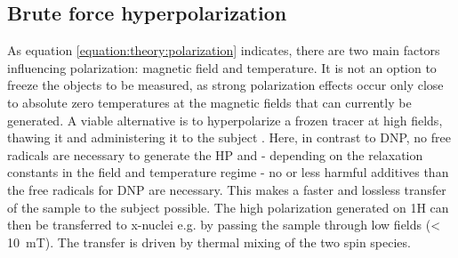         \subsection{Brute force hyperpolarization}
        As equation \ref{equation:theory:polarization} indicates, there are two main factors influencing polarization: magnetic field and temperature. It is not an option to freeze the objects to be measured, as strong polarization effects occur only close to absolute zero temperatures at the magnetic fields that can currently be generated. A viable alternative is to hyperpolarize a frozen tracer at high fields, thawing it and administering it to the subject \cite{hirsch_brute-force_2015}. Here, in contrast to DNP, no free radicals are necessary to generate the HP and - depending on the relaxation constants in the field and temperature regime - no or less harmful additives than the free radicals for DNP are necessary. This makes a faster and lossless transfer of the sample to the subject possible. The high polarization generated on 1H can then be transferred to x-nuclei e.g. by passing the sample through low fields (< \SI{10}{\milli\tesla}). The transfer is driven by thermal mixing \cite{goldman_overview_2008} of the two spin species.
